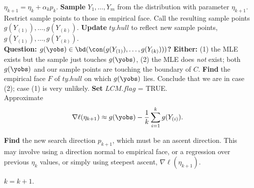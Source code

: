 {\begin{algorithmic}[1]
\State $\eta_{k+1} = \eta_k + \alpha_k p_k$.
\State \textbf{Sample} $Y_1, \ldots, Y_m$ from the distribution with parameter $\eta_{k+1}$.
	\State Restrict sample points to those in empirical face.
\EndIf
\State Call the resulting sample points $g(Y_{(1)}), \ldots, g(Y_{(k)})$.
\State \textbf{Update} $ty.hull$ to reflect new sample points, $g(Y_{(1)}), \ldots, g(Y_{(k)})$.\\
\State \textbf{Question: $g(\yobs) \in \bd( \con(g(Y_{(1)}), \ldots, g(Y_{(k)}) ))$? }
{} %
	\State \textbf{Either:}
	\State (1) the MLE exists but the sample just touches $g(\yobs)$, 
	\State (2) the MLE does \emph{not} exist; both $g(\yobs)$ and our sample points  
	\State are touching the boundary of $C$.
	\State \textbf{Find} the empirical face $F$ of $ty.hull$ on which $g(\yobs)$ lies.
		\State Conclude that we are in case (2); case (1) is very unlikely.
		\State \textbf{Set} $LCM.flag$ = TRUE.
	\EndIf
\EndIf\\
	\State Approximate
	\begin{align} \label{E:nabla ell approx LCM}
	\nabla \ell( \eta_{k+1}) \approx g(\yobs) - \frac{1}{k}\sum_{i=1}^k g(Y_{(i)}).
	\end{align}


\State \textbf{Find} the new search direction $p_{k+1}$, which must be an ascent 
direction.
\Statex This may involve using a direction normal to empirical face, or a regression 
\Statex over previous $\eta_k$ values, or simply using steepest ascent, $\nabla \ell
( \eta_{k+1})$.

\State $k = k + 1$.
\EndWhile
\end{algorithmic}
}
